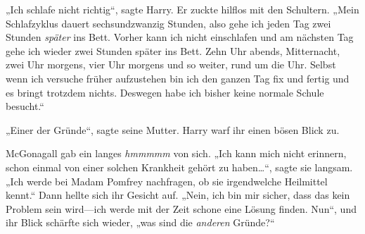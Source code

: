 „Ich schlafe nicht richtig“, sagte Harry. Er zuckte hilflos mit den Schultern. „Mein Schlafzyklus dauert sechsundzwanzig Stunden, also gehe ich jeden Tag zwei Stunden \emph{später} ins Bett. Vorher kann ich nicht einschlafen und am nächsten Tag gehe ich wieder zwei Stunden später ins Bett. Zehn Uhr abends, Mitternacht, zwei Uhr morgens, vier Uhr morgens und so weiter, rund um die Uhr. Selbst wenn ich versuche früher aufzustehen bin ich den ganzen Tag fix und fertig und es bringt trotzdem nichts. Deswegen habe ich bisher keine normale Schule besucht.“

„Einer der Gründe“, sagte seine Mutter. Harry warf ihr einen bösen Blick zu.

McGonagall gab ein langes \emph{hmmmmm} von sich. „Ich kann mich nicht erinnern, schon einmal von einer solchen Krankheit gehört zu haben…“, sagte sie langsam. „Ich werde bei Madam Pomfrey nachfragen, ob sie irgendwelche Heilmittel kennt.“ Dann hellte sich ihr Gesicht auf. „Nein, ich bin mir sicher, dass das kein Problem sein wird—ich werde mit der Zeit schone eine Lösung finden. Nun“, und ihr Blick schärfte sich wieder, „was sind die \emph{anderen} Gründe?“

